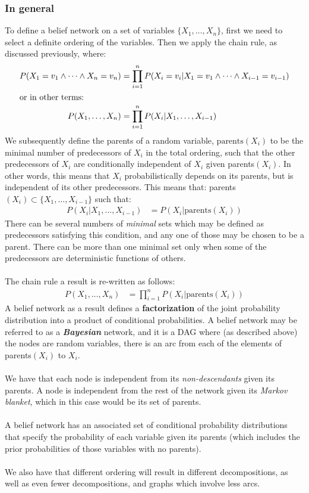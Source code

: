 \documentclass{article}
\begin{document}
\subsubsection*{In general}
To define a belief network on a set of variables $ \{X_1, \dots, X_n\} $, first we need to select a definite ordering of the variables. Then we apply the chain rule, as discussed previously, where:
\begin{align*}
P(X_1 = v_1 \land \dots \land X_n = v_n)&= \prod_{i=1}^n P(X_i = v_i | X_1 = v_1 \land \dots \land X_{i-1} = v_{i-1})\\
\intertext{or in other terms:}
P(X_1, \dots, X_n)&= \prod_{i=1}^n P(X_i | X_1, \dots, X_{i-1})
\end{align*}
We subsequently define the parents of a random variable, $ \text{parents}(X_i) $ to be the minimal number of predecessors of $ X_i $ in the total ordering, such that the other predecessors of $ X_i $ are conditionally independent of $ X_i $ given parents$ (X_i) $. In other words, this means that $ X_i $ probabilistically depends on its parents, but is independent of its other predecessors. This means that: parents$ (X_i) \subset\{X_1, \dots, X_{i-1}\} $ such that:
\begin{align*}
P(X_i | X_1, \dots, X_{i-1}) &= P(X_i | \text{parents}(X_i))
\end{align*}
There can be several numbers of \textit{minimal} sets which may be defined as predecessors satisfying this condition, and any one of those may be chosen to be a parent. There can be more than one minimal set only when some of the predecessors are deterministic functions of others.\\
\\
The chain rule a result is re-written as follows:
\begin{align*}
P(X_1, \dots, X_n)&= \prod_{i=1}^n P(X_i | \text{parents}(X_i))
\end{align*}
A belief network as a result defines a \textbf{factorization} of the joint probability distribution into a product of conditional probabilities. A belief network may be referred to as a \textbf{\textit{Bayesian}} network, and it is a DAG where (as described above) the nodes are random variables, there is an arc from each of the elements of parents$ (X_i) $ to $ X_i $.\\
\\
We have that each node is independent from its \textit{non-descendants} given its parents. A node is independent from the rest of the network given its \textit{Markov blanket}, which in this case would be its set of parents.\\
\\
A belief network has an associated set of conditional probability distributions that specify the probability of each variable given its parents (which includes the prior probabilities of those variables with no parents). \\
\\
We also have that different ordering will result in different decompositions, as well as even fewer decompositions, and graphs which involve less arcs. 
\end{document}
